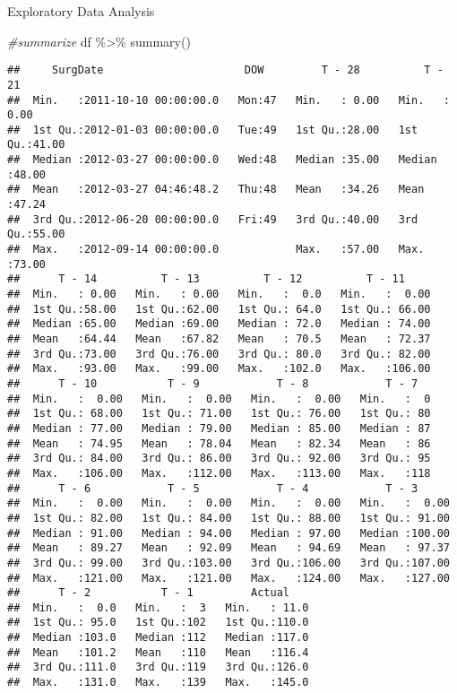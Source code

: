 \documentclass[
  ignorenonframetext,
]{beamer}
\newenvironment{Shaded}{\begin{snugshade}}{\end{snugshade}}
\newcommand{\CommentTok}[1]{\textcolor[rgb]{0.56,0.35,0.01}{\textit{#1}}}
\newcommand{\FunctionTok}[1]{\textcolor[rgb]{0.00,0.00,0.00}{#1}}
\newcommand{\NormalTok}[1]{#1}
\newcommand{\SpecialCharTok}[1]{\textcolor[rgb]{0.00,0.00,0.00}{#1}}
\begin{document}
\begin{frame}[fragile]{Exploratory Data Analysis}
\protect\hypertarget{exploratory-data-analysis}{}
\begin{Shaded}
\begin{Highlighting}[]
\CommentTok{\#summarize}
\NormalTok{df }\SpecialCharTok{\%\textgreater{}\%} 
  \FunctionTok{summary}\NormalTok{()}
\end{Highlighting}
\end{Shaded}

\begin{verbatim}
##     SurgDate                      DOW         T - 28          T - 21     
##  Min.   :2011-10-10 00:00:00.0   Mon:47   Min.   : 0.00   Min.   : 0.00  
##  1st Qu.:2012-01-03 00:00:00.0   Tue:49   1st Qu.:28.00   1st Qu.:41.00  
##  Median :2012-03-27 00:00:00.0   Wed:48   Median :35.00   Median :48.00  
##  Mean   :2012-03-27 04:46:48.2   Thu:48   Mean   :34.26   Mean   :47.24  
##  3rd Qu.:2012-06-20 00:00:00.0   Fri:49   3rd Qu.:40.00   3rd Qu.:55.00  
##  Max.   :2012-09-14 00:00:00.0            Max.   :57.00   Max.   :73.00  
##      T - 14          T - 13          T - 12          T - 11      
##  Min.   : 0.00   Min.   : 0.00   Min.   :  0.0   Min.   :  0.00  
##  1st Qu.:58.00   1st Qu.:62.00   1st Qu.: 64.0   1st Qu.: 66.00  
##  Median :65.00   Median :69.00   Median : 72.0   Median : 74.00  
##  Mean   :64.44   Mean   :67.82   Mean   : 70.5   Mean   : 72.37  
##  3rd Qu.:73.00   3rd Qu.:76.00   3rd Qu.: 80.0   3rd Qu.: 82.00  
##  Max.   :93.00   Max.   :99.00   Max.   :102.0   Max.   :106.00  
##      T - 10           T - 9            T - 8            T - 7    
##  Min.   :  0.00   Min.   :  0.00   Min.   :  0.00   Min.   :  0  
##  1st Qu.: 68.00   1st Qu.: 71.00   1st Qu.: 76.00   1st Qu.: 80  
##  Median : 77.00   Median : 79.00   Median : 85.00   Median : 87  
##  Mean   : 74.95   Mean   : 78.04   Mean   : 82.34   Mean   : 86  
##  3rd Qu.: 84.00   3rd Qu.: 86.00   3rd Qu.: 92.00   3rd Qu.: 95  
##  Max.   :106.00   Max.   :112.00   Max.   :113.00   Max.   :118  
##      T - 6            T - 5            T - 4            T - 3       
##  Min.   :  0.00   Min.   :  0.00   Min.   :  0.00   Min.   :  0.00  
##  1st Qu.: 82.00   1st Qu.: 84.00   1st Qu.: 88.00   1st Qu.: 91.00  
##  Median : 91.00   Median : 94.00   Median : 97.00   Median :100.00  
##  Mean   : 89.27   Mean   : 92.09   Mean   : 94.69   Mean   : 97.37  
##  3rd Qu.: 99.00   3rd Qu.:103.00   3rd Qu.:106.00   3rd Qu.:107.00  
##  Max.   :121.00   Max.   :121.00   Max.   :124.00   Max.   :127.00  
##      T - 2           T - 1         Actual     
##  Min.   :  0.0   Min.   :  3   Min.   : 11.0  
##  1st Qu.: 95.0   1st Qu.:102   1st Qu.:110.0  
##  Median :103.0   Median :112   Median :117.0  
##  Mean   :101.2   Mean   :110   Mean   :116.4  
##  3rd Qu.:111.0   3rd Qu.:119   3rd Qu.:126.0  
##  Max.   :131.0   Max.   :139   Max.   :145.0
\end{verbatim}


\end{frame}
\end{document}
